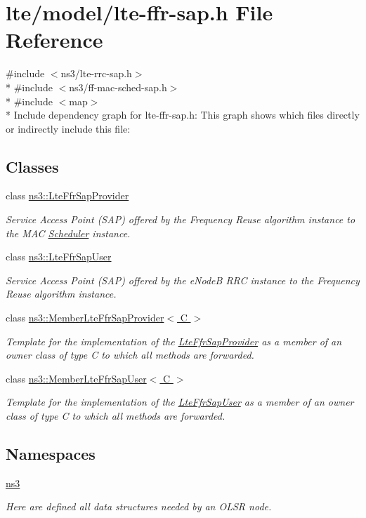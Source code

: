 \hypertarget{lte-ffr-sap_8h}{}\section{lte/model/lte-\/ffr-\/sap.h File Reference}
\label{lte-ffr-sap_8h}
{\ttfamily \#include $<$ns3/lte-\/rrc-\/sap.\+h$>$}\\*
{\ttfamily \#include $<$ns3/ff-\/mac-\/sched-\/sap.\+h$>$}\\*
{\ttfamily \#include $<$map$>$}\\*
Include dependency graph for lte-\/ffr-\/sap.h\+:
This graph shows which files directly or indirectly include this file\+:
\subsection*{Classes}
\begin{DoxyCompactItemize}
\item 
class \hyperlink{classns3_1_1LteFfrSapProvider}{ns3\+::\+Lte\+Ffr\+Sap\+Provider}
\begin{DoxyCompactList}\small\item\em Service Access Point (S\+AP) offered by the Frequency Reuse algorithm instance to the M\+AC \hyperlink{classns3_1_1Scheduler}{Scheduler} instance. \end{DoxyCompactList}\item 
class \hyperlink{classns3_1_1LteFfrSapUser}{ns3\+::\+Lte\+Ffr\+Sap\+User}
\begin{DoxyCompactList}\small\item\em Service Access Point (S\+AP) offered by the e\+NodeB R\+RC instance to the Frequency Reuse algorithm instance. \end{DoxyCompactList}\item 
class \hyperlink{classns3_1_1MemberLteFfrSapProvider}{ns3\+::\+Member\+Lte\+Ffr\+Sap\+Provider$<$ C $>$}
\begin{DoxyCompactList}\small\item\em Template for the implementation of the \hyperlink{classns3_1_1LteFfrSapProvider}{Lte\+Ffr\+Sap\+Provider} as a member of an owner class of type C to which all methods are forwarded. \end{DoxyCompactList}\item 
class \hyperlink{classns3_1_1MemberLteFfrSapUser}{ns3\+::\+Member\+Lte\+Ffr\+Sap\+User$<$ C $>$}
\begin{DoxyCompactList}\small\item\em Template for the implementation of the \hyperlink{classns3_1_1LteFfrSapUser}{Lte\+Ffr\+Sap\+User} as a member of an owner class of type C to which all methods are forwarded. \end{DoxyCompactList}\end{DoxyCompactItemize}
\subsection*{Namespaces}
\begin{DoxyCompactItemize}
\item 
 \hyperlink{namespacens3}{ns3}
\begin{DoxyCompactList}\small\item\em Here are defined all data structures needed by an O\+L\+SR node. \end{DoxyCompactList}\end{DoxyCompactItemize}
